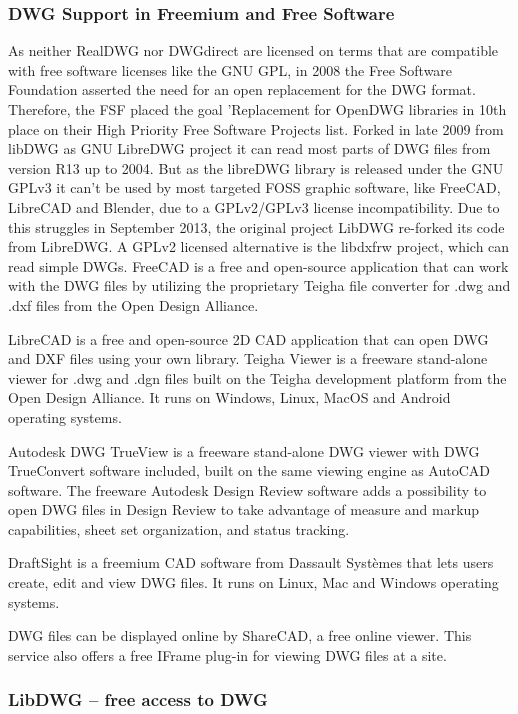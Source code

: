 \documentclass[a4paper, 11pt, article]{report}
\begin{document}
\subsubsection{DWG Support in Freemium and Free Software}

As neither RealDWG nor DWGdirect are licensed on terms that are compatible with free software licenses like the GNU GPL, in 2008 the Free Software Foundation asserted the need for an open replacement for the DWG format. Therefore, the FSF placed the goal 'Replacement for OpenDWG libraries in 10th place on their High Priority Free Software Projects list. Forked in late 2009 from libDWG as GNU LibreDWG project it can read most parts of DWG files from version R13 up to 2004. But as the libreDWG library is released under the GNU GPLv3 it can't be used by most targeted FOSS graphic software, like FreeCAD, LibreCAD and Blender, due to a GPLv2/GPLv3 license incompatibility. Due to this struggles in September 2013, the original project LibDWG re-forked its code from LibreDWG. A GPLv2 licensed alternative is the libdxfrw project, which can read simple DWGs. 
FreeCAD is a free and open-source application that can work with the DWG files by utilizing the proprietary Teigha file converter for .dwg and .dxf files from the Open Design Alliance. 

LibreCAD is a free and open-source 2D CAD application that can open DWG and DXF files using your own library.
Teigha Viewer is a freeware stand-alone viewer for .dwg and .dgn files built on the Teigha development platform from the Open Design Alliance. It runs on Windows, Linux, MacOS and Android operating systems.

Autodesk DWG TrueView is a freeware stand-alone DWG viewer with DWG TrueConvert software included, built on the same viewing engine as AutoCAD software. The freeware Autodesk Design Review software adds a possibility to open DWG files in Design Review to take advantage of measure and markup capabilities, sheet set organization, and status tracking.

DraftSight is a freemium CAD software from Dassault Systèmes that lets users create, edit and view DWG files. It runs on Linux, Mac and Windows operating systems. 

DWG files can be displayed online by ShareCAD, a free online viewer. This service also offers a free IFrame plug-in for viewing DWG files at a site.

\subsubsection{LibDWG – free access to DWG}
\end{document}
